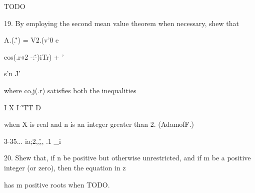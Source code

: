 TODO 

19. By employing the second mean value theorem when necessary, shew
that

A.(.\^') = V2.(v'0 e

cos(.r«2 -:\^-)iTr) + '

s'n J'

where co,j(.r) satisfies both the inequalities

I X I \^'TT D

when X is real and n is an integer greater than 2. (AdamofF.)

3-35... ia;2,,\^,, .1 \_i

20. Shew that, if n be positive but otherwise unrestricted, and if m
be a positive integer (or zero), then the equation in z

has m positive roots when TODO. 